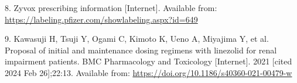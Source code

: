 \documentclass[
  letterpaper,
  DIV=11,
  numbers=noendperiod]{scrartcl}
\newlength{\cslhangindent}
\newenvironment{CSLReferences}[2] %
 {\begin{list}{}{%
  \setlength{\itemindent}{0pt}
  \setlength{\leftmargin}{0pt}
  \setlength{\parsep}{0pt}
  \ifodd #1
   \setlength{\leftmargin}{\cslhangindent}
   \setlength{\itemindent}{-1\cslhangindent}
  \fi
  \setlength{\itemsep}{#2\baselineskip}}}
 {\end{list}}
\begin{document}
\begin{CSLReferences}{0}{1}
8. Zyvox prescribing information {[}Internet{]}. Available from:
\url{https://labeling.pfizer.com/showlabeling.aspx?id=649}

9. Kawasuji H, Tsuji Y, Ogami C, Kimoto K, Ueno A, Miyajima Y, et al.
Proposal of initial and maintenance dosing regimens with linezolid for
renal impairment patients. BMC Pharmacology and Toxicology
{[}Internet{]}. 2021 {[}cited 2024 Feb 26{]};22:13. Available from:
\url{https://doi.org/10.1186/s40360-021-00479-w}

\end{CSLReferences}
\end{document}
